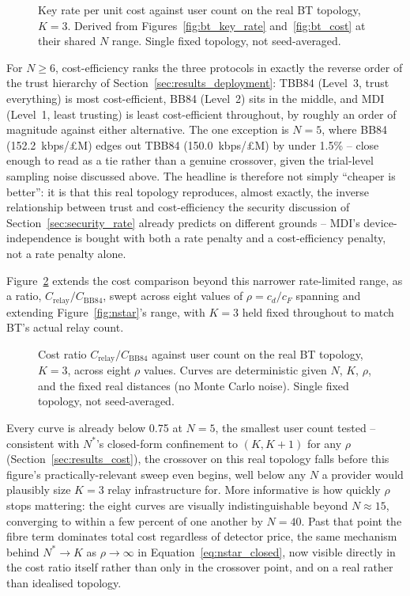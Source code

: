 \documentclass[12pt]{article}
\begin{document}
\begin{figure}[hbtp]
    \centering
    
    \caption{Key rate per unit cost against user count on the real BT topology, $K=3$. Derived from Figures~\ref{fig:bt_key_rate} and~\ref{fig:bt_cost} at their shared $N$ range. Single fixed topology, not seed-averaged.}
    \label{fig:bt_efficiency}
\end{figure}

For $N\geq6$, cost-efficiency ranks the three protocols in exactly the reverse order of the trust hierarchy of Section~\ref{sec:results_deployment}: TBB84 (Level~3, trust everything) is most cost-efficient, BB84 (Level~2) sits in the middle, and MDI (Level~1, least trusting) is least cost-efficient throughout, by roughly an order of magnitude against either alternative. The one exception is $N=5$, where BB84 (152.2~kbps/\pounds M) edges out TBB84 (150.0~kbps/\pounds M) by under 1.5\% -- close enough to read as a tie rather than a genuine crossover, given the trial-level sampling noise discussed above. The headline is therefore not simply ``cheaper is better'': it is that this real topology reproduces, almost exactly, the inverse relationship between trust and cost-efficiency the security discussion of Section~\ref{sec:security_rate} already predicts on different grounds -- MDI's device-independence is bought with both a rate penalty and a cost-efficiency penalty, not a rate penalty alone.

Figure~\ref{fig:bt_cost_ratio} extends the cost comparison beyond this narrower rate-limited range, as a ratio, $C_\text{relay}/C_\text{BB84}$, swept across eight values of $\rho=c_d/c_F$ spanning and extending Figure~\ref{fig:nstar}'s range, with $K=3$ held fixed throughout to match BT's actual relay count.

\begin{figure}[hbtp]
    \centering
    
    \caption{Cost ratio $C_\text{relay}/C_\text{BB84}$ against user count on the real BT topology, $K=3$, across eight $\rho$ values. Curves are deterministic given $N$, $K$, $\rho$, and the fixed real distances (no Monte Carlo noise). Single fixed topology, not seed-averaged.}
    \label{fig:bt_cost_ratio}
\end{figure}

Every curve is already below 0.75 at $N=5$, the smallest user count tested -- consistent with $N^*$'s closed-form confinement to $(K,K{+}1)$ for any $\rho$ (Section~\ref{sec:results_cost}), the crossover on this real topology falls before this figure's practically-relevant sweep even begins, well below any $N$ a provider would plausibly size $K=3$ relay infrastructure for. More informative is how quickly $\rho$ stops mattering: the eight curves are visually indistinguishable beyond $N\approx15$, converging to within a few percent of one another by $N=40$. Past that point the fibre term dominates total cost regardless of detector price, the same mechanism behind $N^*\to K$ as $\rho\to\infty$ in Equation~\ref{eq:nstar_closed}, now visible directly in the cost ratio itself rather than only in the crossover point, and on a real rather than idealised topology.
\end{document}
